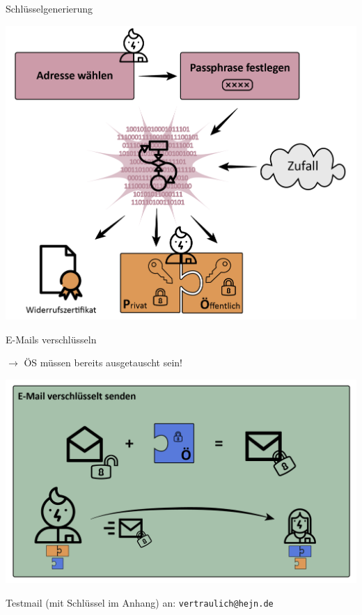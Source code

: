 \documentclass{beamer}
\begin{document}
\begin{frame}{Schlüsselgenerierung}
  \begin{center}
  \includegraphics[width=.8\textwidth]{img-src/pgp_keygen.png}
  \end{center}
\end{frame}


\begin{frame}{E-Mails verschlüsseln}

  $\rightarrow$ ÖS müssen bereits ausgetauscht sein!

  \begin{center}
  \includegraphics[width=.9\textwidth]{img-src/pgp_enc.png}
  \end{center}

  Testmail (mit Schlüssel im Anhang) an: \texttt{vertraulich@hejn.de}

\end{frame}
\end{document}
